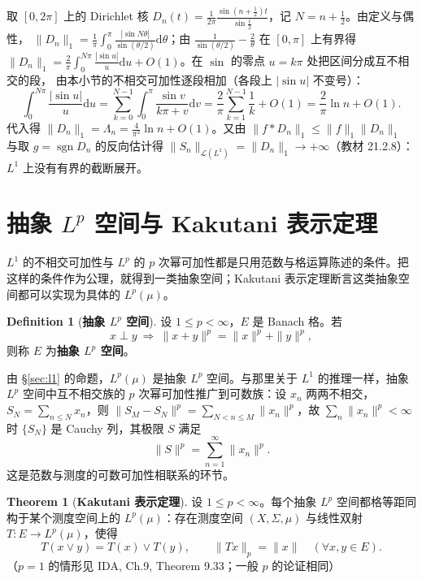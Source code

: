 \documentclass[oneside]{book}
\theoremstyle{definition}
\newcommand{\dd}{\mathrm{d}}
\DeclareMathOperator{\sgn}{sgn}
\theoremstyle{definition}
\newtheorem{definition}{Definition}[section]
\newtheorem{theorem}{Theorem}[section]
\begin{document}
	\begin{link}[教材 21.2 的定量核心]
		取 $[0,2\pi]$ 上的 Dirichlet 核 $D_{n}(t)=\frac{1}{2\pi}\frac{\sin\left(n+\frac12\right)t}{\sin\frac t2}$，记 $N=n+\frac12$。由定义与偶性，
		$\|D_{n}\|_{1}=\frac{1}{\pi}\int_{0}^{\pi}\frac{|\sin N\theta|}{\sin(\theta/2)}\dd\theta$；由 $\frac{1}{\sin(\theta/2)}-\frac{2}{\theta}$ 在 $[0,\pi]$ 上有界得
		$\|D_{n}\|_{1}=\frac{2}{\pi}\int_{0}^{N\pi}\frac{|\sin u|}{u}\dd u+O(1)$。在 $\sin$ 的零点 $u=k\pi$ 处把区间分成互不相交的段，
		由本小节的不相交可加性逐段相加（各段上 $|\sin u|$ 不变号）：
		\[
		\int_{0}^{N\pi}\frac{|\sin u|}{u}\dd u=\sum_{k=0}^{N-1}\int_{0}^{\pi}\frac{\sin v}{k\pi+v}\dd v
		=\frac{2}{\pi}\sum_{k=1}^{N-1}\frac1k+O(1)=\frac{2}{\pi}\ln n+O(1).
		\]
		代入得 $\|D_{n}\|_{1}=\Lambda_{n}=\frac{4}{\pi^{2}}\ln n+O(1)$。又由 $\|f*D_{n}\|_{1}\leqslant\|f\|_{1}\|D_{n}\|_{1}$ 与取 $g=\sgn D_{n}$ 的反向估计得
		$\|S_{n}\|_{\mathcal{L}(L^{1})}=\|D_{n}\|_{1}\to+\infty$（教材 21.2.8）：$L^{1}$ 上没有有界的截断展开。
	\end{link}
	
	\section{抽象 $L^{p}$ 空间与 Kakutani 表示定理}\label{sec:abs}
	
	$L^{1}$ 的不相交可加性与 $L^{p}$ 的 $p$ 次幂可加性都是只用范数与格运算陈述的条件。把这样的条件作为公理，就得到一类抽象空间；Kakutani 表示定理断言这类抽象空间都可以实现为具体的 $L^{p}(\mu)$。
	
	\begin{definition}[\bfseries{抽象 $L^{p}$ 空间}]
		设 $1\leqslant p<\infty$，$E$ 是 Banach 格。若
		\[
		x\perp y\ \Longrightarrow\ \|x+y\|^{p}=\|x\|^{p}+\|y\|^{p},
		\]
		则称 $E$ 为\textbf{抽象 $L^{p}$ 空间}。
	\end{definition}
	
	由 \S\ref{sec:l1} 的命题，$L^{p}(\mu)$ 是抽象 $L^{p}$ 空间。与那里关于 $L^{1}$ 的推理一样，抽象 $L^{p}$ 空间中互不相交族的 $p$ 次幂可加性推广到可数族：设 $x_{n}$ 两两不相交，$S_{N}=\sum_{n\leqslant N}x_{n}$，则 $\|S_{M}-S_{N}\|^{p}=\sum_{N<n\leqslant M}\|x_{n}\|^{p}$，故 $\sum_{n}\|x_{n}\|^{p}<\infty$ 时 $\{S_{N}\}$ 是 Cauchy 列，其极限 $S$ 满足
	\[
	\|S\|^{p}=\sum_{n=1}^{\infty}\|x_{n}\|^{p}.
	\]
	这是范数与测度的可数可加性相联系的环节。
	
	\begin{theorem}[\bfseries{Kakutani 表示定理}]
		设 $1\leqslant p<\infty$。每个抽象 $L^{p}$ 空间都格等距同构于某个测度空间上的 $L^{p}(\mu)$：存在测度空间 $(X,\Sigma,\mu)$ 与线性双射 $T:E\to L^{p}(\mu)$，使得
		\[
		T(x\vee y)=T(x)\vee T(y),\qquad \|Tx\|_{p}=\|x\|\quad(\forall x,y\in E).
		\]
		（$p=1$ 的情形见 IDA, Ch.9, Theorem 9.33；一般 $p$ 的论证相同）
	\end{theorem}
	
\end{document}
